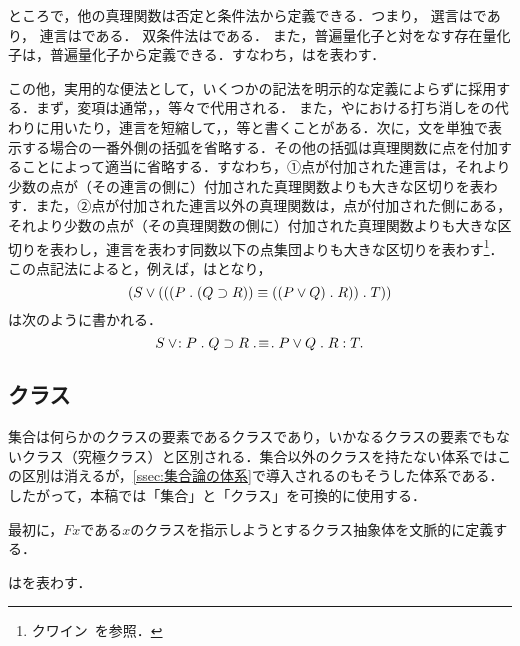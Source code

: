 ところで，他の真理関数は否定と条件法から定義できる．つまり，
選言はであり，
連言はである．
双条件法はである．
また，普遍量化子と対をなす存在量化子は，普遍量化子から定義できる．すなわち，はを表わす．

この他，実用的な便法として，いくつかの記法を明示的な定義によらずに採用する．まず，変項は通常，，等々で代用される．
また，\kagi{$\notin$}や\kagi{$\neq$}における打ち消しを\kagi{$\neg$}の代わりに用いたり，連言を短縮して，，等と書くことがある．次に，文を単独で表示する場合の一番外側の括弧を省略する．その他の括弧は真理関数に点を付加することによって適当に省略する．すなわち，①点が付加された連言は，それより少数の点が（その連言の側に）付加された真理関数よりも大きな区切りを表わす．また，②点が付加された連言以外の真理関数は，点が付加された側にある，それより少数の点が（その真理関数の側に）付加された真理関数よりも大きな区切りを表わし，連言を表わす同数以下の点集団よりも大きな区切りを表わす\footnote{
    クワイン~\cite[pp.\,26--28]{クワインb}を参照．
}．この点記法によると，例えば，はとなり，
\[
    (S\lor(((P\con{1}(Q\supset R))\equiv((P\lor Q)\con{1}R))\con{1}T))
\]
は次のように書かれる．
\[
    S\case{2}{0}{2}P\con{1}Q\supset R\case{3}{1}{1}P\lor Q\con{1}R\con{2}T.
\]

\subsection{クラス}
\label{ssec:クラス}

集合は何らかのクラスの要素であるクラスであり，いかなるクラスの要素でもないクラス（究極クラス）と区別される．集合以外のクラスを持たない体系ではこの区別は消えるが，\ref{ssec:集合論の体系}で導入されるのもそうした体系である．したがって，本稿では「集合」と「クラス」を可換的に使用する．

最初に，$Fx$である$x$のクラスを指示しようとするクラス抽象体を文脈的に定義する．

\begin{df}
\label{df:クラス抽象A}
はを表わす．
\end{df}

